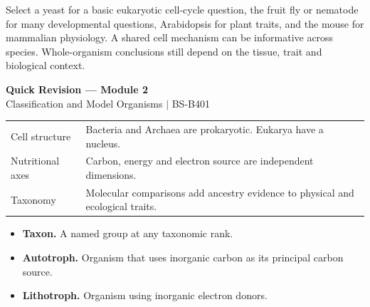 \documentclass[12pt,a4paper]{article}
\renewcommand{\arraystretch}{1.45}
\begin{document}
\begin{tcolorbox}[masonbox, title={Defend a choice of model organism}]
Select a yeast for a basic eukaryotic cell-cycle question, the fruit fly or nematode for many developmental questions, Arabidopsis for plant traits, and the mouse for mammalian physiology. A shared cell mechanism can be informative across species. Whole-organism conclusions still depend on the tissue, trait and biological context.
\end{tcolorbox}

\newpage
\begin{center}
  {\large\bfseries\color{myred} Quick Revision --- Module 2}\\[3pt]
  {\small\color{mydark} Classification and Model Organisms $|$ BS-B401}
\end{center}
\noindent{\color{myred}\rule{\linewidth}{1.2pt}}\par\vspace{4pt}

\begin{tcolorbox}[formulabox, title={Key Concepts at a Glance}]
\renewcommand{\arraystretch}{1.35}
\noindent\begin{tabularx}{\linewidth}{B{4.5cm}Y}
Cell structure & Bacteria and Archaea are prokaryotic. Eukarya have a nucleus. \\[3pt]
Nutritional axes & Carbon, energy and electron source are independent dimensions. \\[3pt]
Taxonomy & Molecular comparisons add ancestry evidence to physical and ecological traits. \\[3pt]
\end{tabularx}\par
\end{tcolorbox}

\begin{tcolorbox}[defbox, title={One-Line Definitions}]
\begin{itemize}[leftmargin=*, itemsep=3pt, topsep=4pt]
  \item \textbf{Taxon.} A named group at any taxonomic rank.
  \item \textbf{Autotroph.} Organism that uses inorganic carbon as its principal carbon source.
  \item \textbf{Lithotroph.} Organism using inorganic electron donors.
\end{itemize}
\end{tcolorbox}
\end{document}
